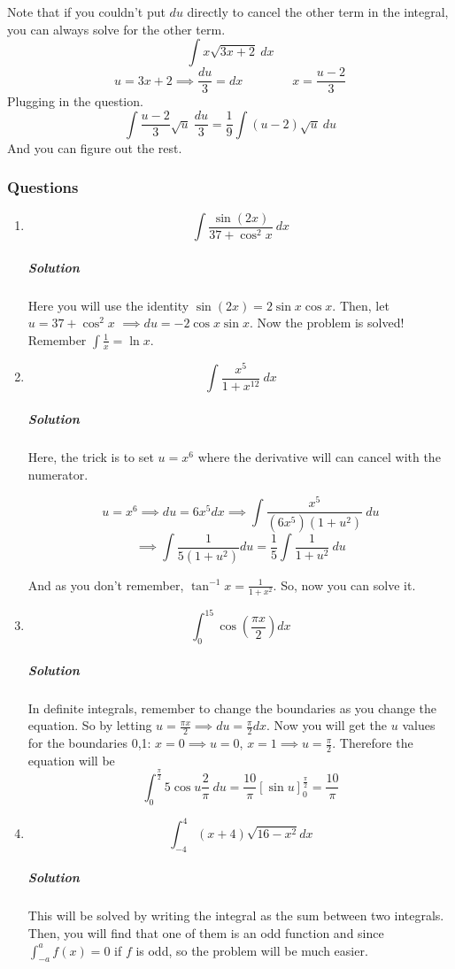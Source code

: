 \documentclass{article}
\begin{document}
	Note that if you couldn't put $du$ directly to cancel the other term in the integral, you can always solve for the other term.
	\[
		\int x \sqrt{ 3x+2 }\ dx 
	\]
	\[
		u = 3x + 2 \implies \frac{du}{3} = dx \qquad \qquad x = \frac{u-2}{3}
	\]
	Plugging in the  question.
	\[
		\int \frac{ u-2 }{ 3 } \sqrt{ u }\ \frac{du}{3} = \frac{1}{9} \int (u-2) \sqrt{ u }\ du 
	\]
	And you can figure out the rest.

	\newpage
	\subsubsection{Questions}
	\begin{enumerate}[1.]
		\item \[	\int \frac{ \sin(2x) }{ 37 + \cos^2{x}}\ dx  \]
			\subparagraph{Solution}

			Here you will use the identity $ \sin(2x) = 2 \sin{ x } \cos{ x }  $. Then, let $ u = 37+\cos^2x 
			$ $\implies du=-2 \cos{ x } \sin{ x } $. Now the problem is solved! Remember $\int \frac{1}{x}= \ln{x}$.

		\item \[ \int \frac{x^5}{1+x^{12}}\ dx \]

			\subparagraph{Solution}
			Here, the trick is to set $u=x^6$ where the derivative will can cancel with the numerator. 

			\[
				u = x^6 \implies du = 6x^5dx \implies \int \frac{ x^5 }{ (6x^5) (1+u^2) } \ du 
			\]
			\[
				\implies \int \frac{ 1 }{ 5(1+u^2) } du = \frac{1}{5} \int \frac{ 1 }{ 1 + u^2 }\ du
			\]

			And as you don't remember, $ \tan^{-1}x= \frac{ 1 }{ 1 + x^2 }  $. So, now you can solve it. 

		\item \[
				\int_0^15 \cos{ (\frac{ \pi x }{ 2 } ) } dx
			\]

			\subparagraph{Solution}
			In definite integrals, remember to change the boundaries as you change the equation. 
			So by letting $u= \frac{ \pi x  }{ 2 } \implies du = \frac{\pi}{2} dx$. Now you will get the $u$ values for the boundaries 0,1: $ x=0 \implies u = 0 $, $ x = 1 \implies u = \frac{\pi}{2} $. Therefore the equation will be
			\[
				\int_0^{\frac{\pi}{2}} 5 \cos{ u } \frac{2}{\pi}\ du = \frac{10}{\pi} \left[ \sin{ u }  \right]^{ \frac{\pi}{2} }_{0} = \frac{10}{\pi}
			\]

		\item \[ \int^4_{-4} (x+4) \sqrt{ 16-x^2 } dx \]

			\subparagraph{Solution}
			This will be solved by writing the integral as the sum between two integrals. Then, you will find that one of them is an odd function and since $ \int^a_{-a}f(x) = 0 $ if $ f $ is odd, so the problem will be much easier.


\end{enumerate}
\end{document}
